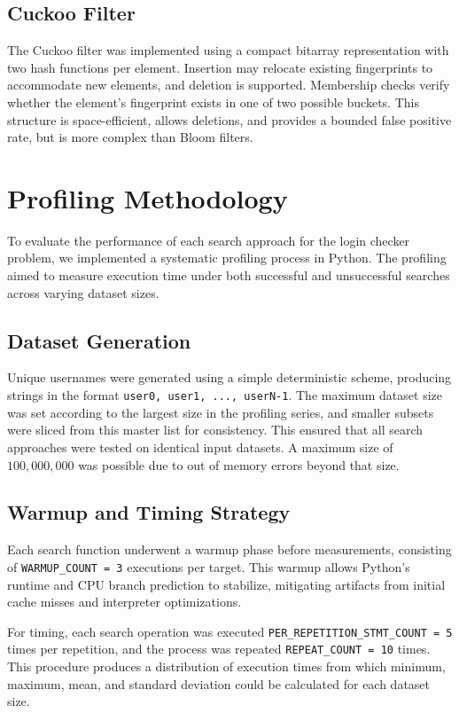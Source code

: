 \documentclass[acmsmall,screen, nonacm]{acmart}
\begin{document}
\subsection{Cuckoo Filter}
The Cuckoo filter was implemented using a compact bitarray representation with two hash functions per element.
Insertion may relocate existing fingerprints to accommodate new elements, and deletion is supported.
Membership checks verify whether the element's fingerprint exists in one of two possible buckets.
This structure is space-efficient, allows deletions, and provides a bounded false positive rate, but is more complex than Bloom filters.

\section{Profiling Methodology}

To evaluate the performance of each search approach for the login checker problem, we implemented a systematic profiling process in Python.
The profiling aimed to measure execution time under both successful and unsuccessful searches across varying dataset sizes.

\subsection{Dataset Generation}
Unique usernames were generated using a simple deterministic scheme, producing strings in the format \texttt{user0, user1, ..., userN-1}.
The maximum dataset size was set according to the largest size in the profiling series, and smaller subsets were sliced from this master list for consistency.
This ensured that all search approaches were tested on identical input datasets.
A maximum size of $100,000,000$ was possible due to out of memory errors beyond that size.

\subsection{Warmup and Timing Strategy}
Each search function underwent a warmup phase before measurements, consisting of \texttt{WARMUP\_COUNT = 3} executions per target.
This warmup allows Python's runtime and CPU branch prediction to stabilize, mitigating artifacts from initial cache misses and interpreter optimizations.

For timing, each search operation was executed \texttt{PER\_REPETITION\_STMT\_COUNT = 5} times per repetition, and the process was repeated \texttt{REPEAT\_COUNT = 10} times.
This procedure produces a distribution of execution times from which minimum, maximum, mean, and standard deviation could be calculated for each dataset size.
\end{document}
